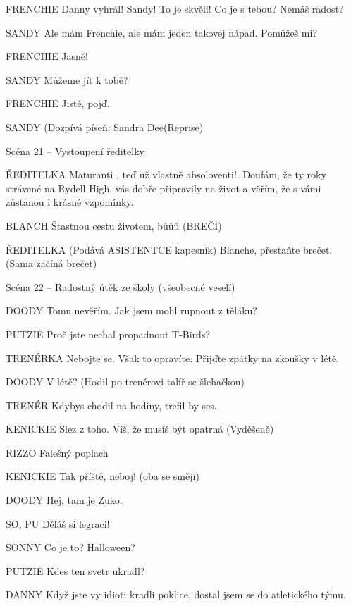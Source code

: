 FRENCHIE        Danny vyhrál! Sandy! To je skvělí! Co je s tebou? Nemáš radost?

SANDY        Ale mám Frenchie, ale mám jeden takovej nápad. Pomůžeš mi? 

FRENCHIE        Jasně! 

SANDY        Můžeme jít k tobě? 

FRENCHIE        Jistě, pojď. 

SANDY        (Dozpívá píseň: Sandra Dee(Reprise)









Scéna 21  – Vystoupení ředitelky 

ŘEDITELKA        Maturanti , teď už vlastně absoloventi!.  Doufám, že ty roky strávené na         Rydell High, vás dobře připravily na život a věřím, že s vámi zůstanou i         krásné vzpomínky. 

BLANCH        Štastnou cestu životem, bůůů (BREČÍ)

ŘEDITELKA        (Podává ASISTENTCE kapesník) Blanche, přestaňte brečet. (Sama                 začíná brečet)





Scéna 22  – Radostný útěk ze školy (všeobecné veselí)

DOODY        Tomu nevěřím. Jak jsem mohl rupnout z těláku?

PUTZIE        Proč jste nechal propadnout T-Birds?

TRENÉRKA        Nebojte se. Však to opravíte. Přijďte zpátky na zkoušky v létě.

DOODY        V létě? (Hodil po trenérovi talíř se šlehačkou)

TRENÉR        Kdybys chodil na hodiny, trefil by ses.

KENICKIE        Slez z toho. Víš, že musíš být opatrná (Vyděšeně)

RIZZO        Falešný poplach

KENICKIE        Tak příště, neboj! (oba se smějí)

DOODY        Hej, tam je Zuko. 

SO, PU        Děláš si legraci!

SONNY        Co je to? Halloween?

PUTZIE        Kdes ten svetr ukradl?

DANNY        Když jste vy idioti kradli poklice, dostal jsem se do atletického týmu. 

